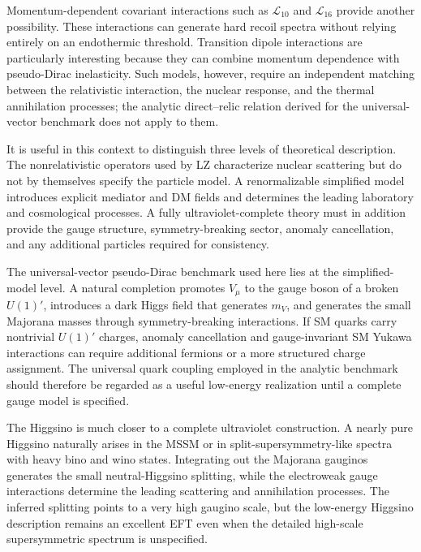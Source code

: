 \documentclass[aps,prd,reprint,superscriptaddress,nofootinbib,longbibliography,floatfix]{revtex4-2}
\begin{document}
Momentum-dependent covariant interactions such as $\mathcal{L}_{10}$ and $\mathcal{L}_{16}$ provide another possibility. These interactions can generate hard recoil spectra without relying entirely on an endothermic threshold. Transition dipole interactions are particularly interesting because they can combine momentum dependence with pseudo-Dirac inelasticity. Such models, however, require an independent matching between the relativistic interaction, the nuclear response, and the thermal annihilation processes; the analytic direct--relic relation derived for the universal-vector benchmark does not apply to them.

It is useful in this context to distinguish three levels of theoretical description. The nonrelativistic operators used by LZ characterize nuclear scattering but do not by themselves specify the particle model. A renormalizable simplified model introduces explicit mediator and DM fields and determines the leading laboratory and cosmological processes. A fully ultraviolet-complete theory must in addition provide the gauge structure, symmetry-breaking sector, anomaly cancellation, and any additional particles required for consistency.

The universal-vector pseudo-Dirac benchmark used here lies at the simplified-model level. A natural completion promotes $V_\mu$ to the gauge boson of a broken $U(1)'$, introduces a dark Higgs field that generates $m_V$, and generates the small Majorana masses through symmetry-breaking interactions. If SM quarks carry nontrivial $U(1)'$ charges, anomaly cancellation and gauge-invariant SM Yukawa interactions can require additional fermions or a more structured charge assignment. The universal quark coupling employed in the analytic benchmark should therefore be regarded as a useful low-energy realization until a complete gauge model is specified.

The Higgsino is much closer to a complete ultraviolet construction. A nearly pure Higgsino naturally arises in the MSSM or in split-supersymmetry-like spectra with heavy bino and wino states. Integrating out the Majorana gauginos generates the small neutral-Higgsino splitting, while the electroweak gauge interactions determine the leading scattering and annihilation processes. The inferred splitting points to a very high gaugino scale, but the low-energy Higgsino description remains an excellent EFT even when the detailed high-scale supersymmetric spectrum is unspecified.
\end{document}
